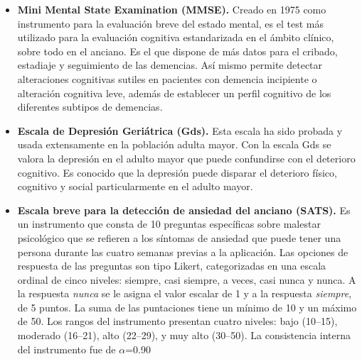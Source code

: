 \begin{itemize}

\item \textbf{Mini Mental State Examination (MMSE).} Creado en 1975 como instrumento para 
la evaluación breve del estado mental, es el test m\'as utilizado para la evaluación cognitiva 
estandarizada en el \'ambito cl\'inico, sobre todo en el anciano. Es el que dispone de m\'as 
datos para el cribado, estadiaje y seguimiento de las demencias. As\'i mismo permite detectar 
alteraciones cognitivas sutiles en pacientes con demencia incipiente o alteraci\'on cognitiva 
leve, adem\'as de establecer un perfil cognitivo de los diferentes subtipos de 
demencias.\cite{Velasco15}

\item \textbf{Escala de Depresi\'on Geri\'atrica (Gds).} Esta escala ha sido probada y usada 
extensamente 
en la población adulta mayor. Con la escala Gds se valora la depresión en el adulto mayor que 
puede confundirse con el deterioro cognitivo. Es conocido que la depresi\'on puede disparar el 
deterioro f\'isico, cognitivo y social particularmente en el adulto 
mayor. \cite{Greenberg12,Cuijpers13}

\item \textbf{Escala breve para la detecci\'on de ansiedad del anciano (SATS).} Es un instrumento 
que 
consta de 10 preguntas espec\'ificas sobre malestar psicol\'ogico que se refieren a los 
s\'intomas de ansiedad que puede tener una persona durante las cuatro semanas previas a la 
aplicaci\'on. Las opciones de respuesta de las preguntas son tipo Likert, categorizadas en una 
escala ordinal de cinco niveles: siempre, casi siempre, a veces, casi nunca y nunca. 
A la respuesta \textit{nunca} se le asigna el valor escalar de 1 y a la respuesta 
\textit{siempre}, de 5 puntos. La suma de las puntaciones tiene un m\'inimo de 10 y un máximo de 
50. Los rangos del instrumento presentan cuatro niveles: bajo (10–15), moderado (16–21), 
alto (22–29), y muy alto (30–50). La consistencia interna del instrumento fue de $\alpha$=0.90
\cite{Vargas11}


\end{itemize}
